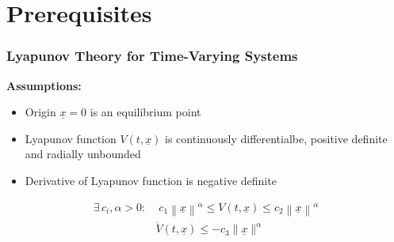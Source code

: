 \documentclass[student, noshadow, lsr, english, aspectratio=169, t]{ITR_LSR_slides}
\begin{document}

\section{Prerequisites}

\begin{frame}
	\frametitle{Lyapunov Theory for Time-Varying Systems}
	\textbf{Assumptions:}
	\begin{itemize}
		\item Origin $\underline{x}=0$ is an equilibrium point
		\item Lyapunov function $V(t,\underline{x})$ is continuously differentialbe, positive definite and radially unbounded
		\item Derivative of Lyapunov function is negative definite
	\end{itemize}
	\vspace{0.2cm}
	\begin{tcolorbox}[title=Globally uniformly exponentially stable:]
		\vspace{-0.4cm}
		\begin{align*}
			\exists\, c_i, \alpha > 0: & \; c_1\left\|\underline{x}\right\|^\alpha \leq V(t,\underline{x}) \leq c_2\left\|\underline{x}\right\|^\alpha  \\
			& \dot{V}(t,\underline{x}) \leq -c_3\|\underline{x}\|^\alpha
		\end{align*}	
	\end{tcolorbox}
	
\end{frame}
\end{document}
